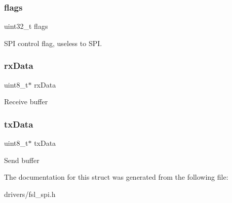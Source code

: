 \subsubsection{\texorpdfstring{flags}{flags}}
{\footnotesize\ttfamily uint32\+\_\+t flags}

S\+PI control flag, useless to S\+PI. \mbox{\label{struct__spi__transfer_ab83c0e07099df7beb8e491cb91914de0}} 
\subsubsection{\texorpdfstring{rxData}{rxData}}
{\footnotesize\ttfamily uint8\+\_\+t$\ast$ rx\+Data}

Receive buffer \mbox{\label{struct__spi__transfer_a03c054bb486fb65133eb9f6849266fb1}} 
\subsubsection{\texorpdfstring{txData}{txData}}
{\footnotesize\ttfamily uint8\+\_\+t$\ast$ tx\+Data}

Send buffer 

The documentation for this struct was generated from the following file\+:\begin{DoxyCompactItemize}
\item 
drivers/fsl\+\_\+spi.\+h\end{DoxyCompactItemize}
